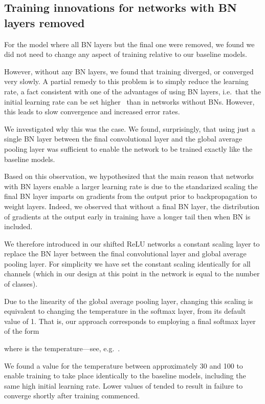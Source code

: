 \documentclass[conference]{IEEEtran}
\begin{document}
\subsection{Training innovations for networks with BN layers removed}

For the model where all BN layers but the final one were removed, we found we did not need to change any aspect of training relative to our baseline models.

However, without any BN layers, we found that training diverged, or converged very slowly. A partial remedy to this problem is to simply reduce the learning rate, a fact consistent with one of the advantages of using BN layers, i.e.~that the initial learning rate can be set higher~\cite{Ioffe.15} than in networks without BNs.  However, this leads to slow convergence and increased error rates.

We investigated why this was the case. We found, surprisingly, that using just a single BN layer between the final convolutional layer and the global average pooling layer  was sufficient to enable the network to be trained exactly like the baseline models. 

Based on this observation, we hypothesized that the main reason that networks with BN layers enable a larger learning rate is due to the standarized scaling the final BN layer imparts on gradients from the output prior to backpropagation to weight layers. Indeed, we observed that without a final BN layer, the distribution of gradients at the output early in training have a longer tail then when BN is included.

We therefore introduced in our shifted ReLU networks a constant scaling layer to replace the BN layer between the final convolutional layer and global average pooling layer. For simplicity we have set the constant scaling identically for all channels (which in our design at this point in the network is equal to the number of classes). 

Due to the linearity of the global average pooling layer, changing this scaling is equivalent to changing the temperature in the softmax layer, from its default value of 1. That is, our approach corresponds to employing a final softmax layer of the form

where  is the temperature---see, e.g.~\cite{Hinton.15,Guo.17}.

We found a value for the temperature between approximately 30 and 100 to enable training to take place identically to the baseline models, including the same high initial learning rate. Lower values of  tended to result in failure to converge shortly after training commenced.
\end{document}
